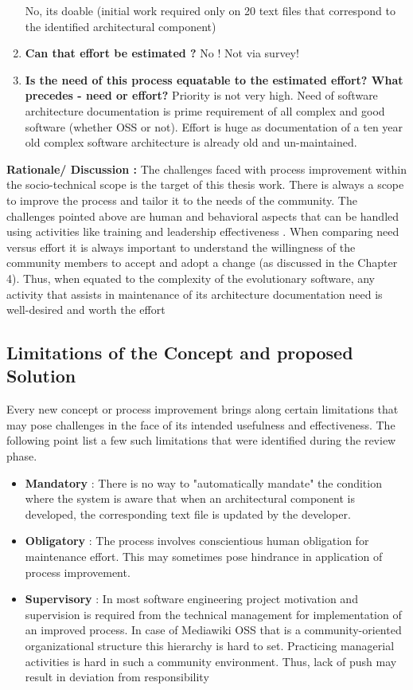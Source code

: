 \begin{enumerate}
\newline No, its doable (initial work required only on 20 text files that correspond to the identified architectural component)
\item \textbf{Can that effort be estimated ?}
\newline No ! Not via survey!
\item \textbf{Is the need of this process equatable to the estimated effort? What precedes - need or effort?}
\newline Priority is not very high. Need of software architecture documentation is prime requirement of all complex and good software (whether OSS or not).
\newline Effort is huge as documentation of a ten year old complex software architecture is already old and un-maintained.
\end{enumerate}
\textbf{Rationale/ Discussion : } The challenges faced with process improvement within the socio-technical scope is the target of this thesis work. There is always a scope to improve the process and tailor it to the needs of the community. The challenges pointed above are human and behavioral aspects that can be handled using activities like training and leadership effectiveness \cite{Viana2012}.
\newline When comparing need versus effort it is always important to understand the willingness of the community members to accept and adopt a change (as discussed in the Chapter 4). Thus, when equated to the complexity of the evolutionary software, any activity that assists in maintenance of its architecture documentation need is well-desired and worth the effort

\subsection{Limitations of the Concept and proposed Solution}
Every new concept or process improvement brings along certain limitations that may pose challenges in the face of its intended usefulness and effectiveness. The following point list a few such limitations that were identified during the review phase.
\begin{itemize}
\item \textbf{Mandatory} : There is no way to "automatically mandate" the condition where the system is aware that when an architectural component is developed, the corresponding text file is updated by the developer.
\item \textbf{Obligatory} : The process involves conscientious human obligation for maintenance effort. This may sometimes pose hindrance in application of process improvement.
\item \textbf{Supervisory} : In most software engineering project motivation and supervision is required from the technical management for implementation of an improved process. In case of Mediawiki OSS that is a community-oriented organizational structure this hierarchy is hard to set. Practicing managerial activities is hard in such a community environment. Thus, lack of push may result in deviation from responsibility
\end{itemize}


